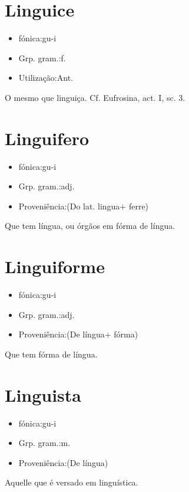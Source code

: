 \section{Linguice}
\begin{itemize}
\item {fónica:gu-i}
\end{itemize}
\begin{itemize}
\item {Grp. gram.:f.}
\end{itemize}
\begin{itemize}
\item {Utilização:Ant.}
\end{itemize}
O mesmo que \textunderscore linguiça\textunderscore . Cf. \textunderscore Eufrosina\textunderscore , act. I, sc. 3.
\section{Linguifero}
\begin{itemize}
\item {fónica:gu-i}
\end{itemize}
\begin{itemize}
\item {Grp. gram.:adj.}
\end{itemize}
\begin{itemize}
\item {Proveniência:(Do lat. \textunderscore lingua\textunderscore  + \textunderscore ferre\textunderscore )}
\end{itemize}
Que tem língua, ou órgãos em fórma de língua.
\section{Linguiforme}
\begin{itemize}
\item {fónica:gu-i}
\end{itemize}
\begin{itemize}
\item {Grp. gram.:adj.}
\end{itemize}
\begin{itemize}
\item {Proveniência:(De \textunderscore língua\textunderscore  + \textunderscore fórma\textunderscore )}
\end{itemize}
Que tem fórma de língua.
\section{Linguista}
\begin{itemize}
\item {fónica:gu-i}
\end{itemize}
\begin{itemize}
\item {Grp. gram.:m.}
\end{itemize}
\begin{itemize}
\item {Proveniência:(De \textunderscore língua\textunderscore )}
\end{itemize}
Aquelle que é versado em linguística.
